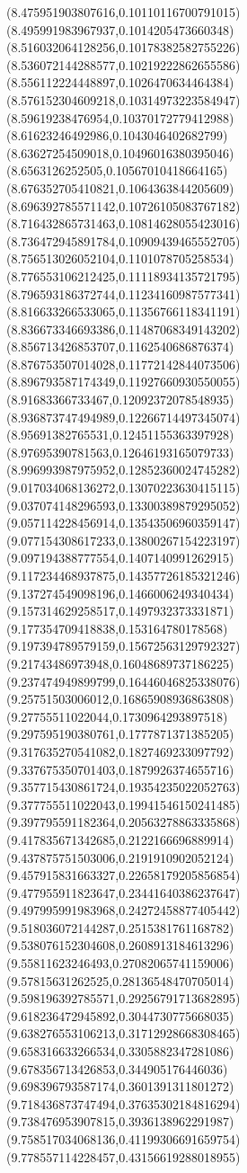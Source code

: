 {(8.475951903807616,0.10110116700791015)
(8.495991983967937,0.1014205473660348)
(8.516032064128256,0.10178382582755226)
(8.536072144288577,0.10219222862655586)
(8.556112224448897,0.1026470634464384)
(8.576152304609218,0.10314973223584947)
(8.59619238476954,0.10370172779412988)
(8.61623246492986,0.1043046402682799)
(8.63627254509018,0.10496016380395046)
(8.6563126252505,0.10567010418664165)
(8.676352705410821,0.1064363844205609)
(8.696392785571142,0.10726105083767182)
(8.716432865731463,0.10814628055423016)
(8.736472945891784,0.10909439465552705)
(8.756513026052104,0.1101078705258534)
(8.776553106212425,0.11118934135721795)
(8.796593186372744,0.11234160987577341)
(8.816633266533065,0.11356766118341191)
(8.836673346693386,0.11487068349143202)
(8.856713426853707,0.1162540686876374)
(8.876753507014028,0.11772142844073506)
(8.896793587174349,0.11927660930550055)
(8.91683366733467,0.12092372078548935)
(8.936873747494989,0.12266714497345074)
(8.95691382765531,0.12451155363397928)
(8.97695390781563,0.12646193165079733)
(8.996993987975952,0.12852360024745282)
(9.017034068136272,0.13070223630415115)
(9.037074148296593,0.13300389879295052)
(9.057114228456914,0.13543506960359147)
(9.077154308617233,0.13800267154223197)
(9.097194388777554,0.1407140991262915)
(9.117234468937875,0.14357726185321246)
(9.137274549098196,0.1466006249340434)
(9.157314629258517,0.1497932373331871)
(9.177354709418838,0.153164780178568)
(9.197394789579159,0.15672563129792327)
(9.21743486973948,0.16048689737186225)
(9.237474949899799,0.16446046825338076)
(9.25751503006012,0.16865908936863808)
(9.27755511022044,0.1730964293897518)
(9.297595190380761,0.1777871371385205)
(9.317635270541082,0.1827469233097792)
(9.337675350701403,0.1879926374655716)
(9.357715430861724,0.19354235022052763)
(9.377755511022043,0.19941546150241485)
(9.397795591182364,0.20563278863335868)
(9.417835671342685,0.2122166696889914)
(9.437875751503006,0.2191910902052124)
(9.457915831663327,0.22658179205856854)
(9.477955911823647,0.23441640386237647)
(9.497995991983968,0.24272458877405442)
(9.518036072144287,0.2515381761168782)
(9.538076152304608,0.2608913184613296)
(9.55811623246493,0.27082065741159006)
(9.57815631262525,0.28136548470705014)
(9.598196392785571,0.29256791713682895)
(9.618236472945892,0.3044730775668035)
(9.638276553106213,0.31712928668308465)
(9.658316633266534,0.3305882347281086)
(9.678356713426853,0.344905176446036)
(9.698396793587174,0.3601391311801272)
(9.718436873747494,0.37635302184816294)
(9.738476953907815,0.3936138962291987)
(9.758517034068136,0.41199306691659754)
(9.778557114228457,0.43156619288018955)
}
